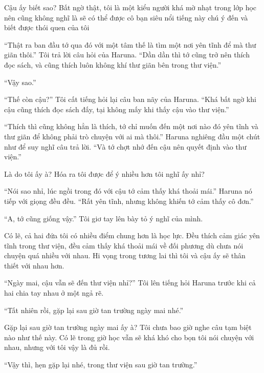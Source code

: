 {Cậu ấy biết sao? Bất ngờ thật, tôi là một kiểu người khá mờ nhạt trong
lớp học nên cũng không nghĩ là sẽ có thể được cô bạn siêu nổi tiếng này
chú ý đến và biết được thói quen của tôi

``Thật ra ban đầu tớ qua đó với một tâm thế là tìm một nơi yên tĩnh để
mà thư giãn thôi.'' Tôi trả lời câu hỏi của Haruna. ``Dần dần thì tớ
cũng trở nên thích đọc sách, và cũng thích luôn không khí thư giãn bên
trong thư viện.''

``Vậy sao.''

``Thế còn cậu?'' Tôi cất tiếng hỏi lại câu ban nãy của Haruna. ``Khá bất
ngờ khi cậu cũng thích đọc sách đấy, tại không mấy khi thấy cậu vào thư
viện.''

``Thích thì cũng không hẳn là thích, tớ chỉ muốn đến một nơi nào đó yên
tĩnh và thư giãn để không phải trò chuyện với ai mà thôi.'' Haruna
nghiêng đầu một chút như để suy nghĩ câu trả lời. ``Và tớ chợt nhớ đến
cậu nên quyết định vào thư viện.''

Là do tôi ấy à? Hóa ra tôi được để ý nhiều hơn tôi nghĩ ấy nhỉ?

``Nói sao nhỉ, lúc ngồi trong đó với cậu tớ cảm thấy khá thoải mái.''
Haruna nó tiếp với giọng đều đều. ``Rất yên tĩnh, nhưng không khiến tớ
cảm thấy cô đơn.''

``A, tớ cũng giống vậy.'' Tôi giơ tay lên bày tỏ ý nghĩ của mình.

Có lẽ, cả hai đứa tôi có nhiều điểm chung hơn là học lực. Đều thích cảm
giác yên tĩnh trong thư viện, đều cảm thấy khá thoải mái về đối phương
dù chưa nói chuyện quá nhiều với nhau. Hi vọng trong tương lai thì tôi
và cậu ấy sẽ thân thiết với nhau hơn.

``Ngày mai, cậu vẫn sẽ đến thư viện nhỉ?'' Tôi lên tiếng hỏi Haruna
trước khi cả hai chia tay nhau ở một ngả rẽ.

``Tất nhiên rồi, gặp lại sau giờ tan trường ngày mai nhé.''

Gặp lại sau giờ tan trường ngày mai ấy à? Tôi chưa bao giờ nghe câu tạm
biệt nào như thế này. Có lẽ trong giờ học vẫn sẽ khá khó cho bọn tôi nói
chuyện với nhau, nhưng với tôi vậy là đủ rồi.

``Vậy thì, hẹn gặp lại nhé, trong thư viện sau giờ tan trường.''

}